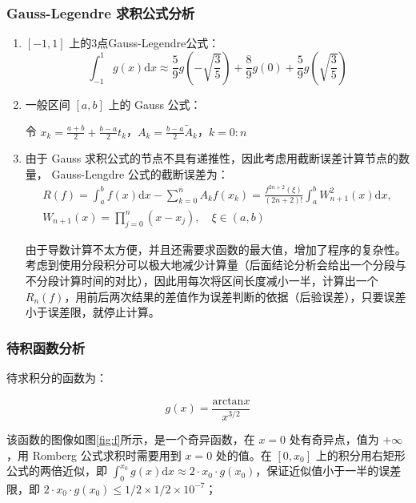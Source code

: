 \subsubsection{Gauss-Legendre 求积公式分析}

\begin{enumerate}[(1)]
    \item $[-1,1]$ 上的3点Gauss-Legendre公式：
    \begin{equation}
        \int_{-1}^1 g(x)\mathrm{d}x \approx \frac{5}{9}g(-\sqrt{\frac{3}{5}}) + \frac{8}{9}g(0) + \frac{5}{9}g(\sqrt{\frac{3}{5}})
    \end{equation}

    \item 一般区间 $[a,b]$ 上的 Gauss 公式：
    
    令 $x_k = \frac{a+b}{2}+\frac{b-a}{2}t_k$，$A_k = \frac{b-a}{2}\tilde{A}_k$，$k=0:n$

    \item 由于 Gauss 求积公式的节点不具有递推性，因此考虑用截断误差计算节点的数量， Gauss-Lengdre 公式的截断误差为：
    \begin{multline}
        R(f) = \int _a^b f(x)\mathrm{d}x - \sum\nolimits_{k=0}^n A_kf(x_k) = \frac{f^{2n+2}(\xi)}{(2n+2)!} \int_a^b W_{n+1}^2(x)\mathrm{d}x, \\
        W_{n+1}(x) = \prod\nolimits_{j=0}^n (x-x_j), \quad \xi \in (a,b)
    \end{multline}

    由于导数计算不太方便，并且还需要求函数的最大值，增加了程序的复杂性。考虑到使用分段积分可以极大地减少计算量（后面结论分析会给出一个分段与不分段计算时间的对比），因此用每次将区间长度减小一半，计算出一个 $R_n(f)$，用前后两次结果的差值作为误差判断的依据（后验误差），只要误差小于误差限，就停止计算。

\end{enumerate}

\subsubsection{待积函数分析}

待求积分的函数为：

\begin{equation}
    g(x) = \frac{\mathrm{arctan}x}{x^{3/2}}
\end{equation}

该函数的图像如图\ref{fig:f}所示，是一个奇异函数，在 $x=0$ 处有奇异点，值为 $+\infty$，用 Romberg 公式求积时需要用到 $x=0$ 处的值。在 $[0,x_0]$ 上的积分用右矩形公式的两倍近似，即 $\int_0^{x_0} g(x) \mathrm{d}x \approx 2\cdot x_0 \cdot g(x_0) $，保证近似值小于一半的误差限，即 $2\cdot x_0 \cdot g(x_0) \leq 1/2 \times 1/2 \times 10^{-7}$；

